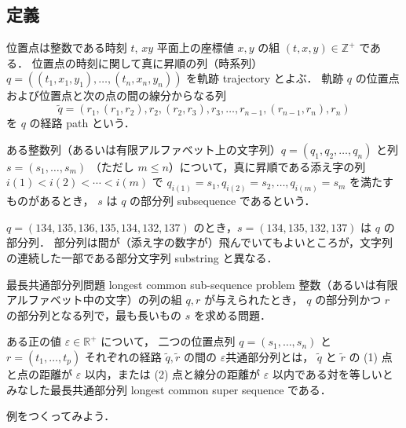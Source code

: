\documentclass[11pt]{jreport}
\begin{document}
\subsection*{定義}
位置点は整数である時刻 $t$, $xy$ 平面上の座標値 $x, y$ の組 $(t, x, y) \in \mathbb{Z}^+$ である． 
位置点の時刻に関して真に昇順の列（時系列） $q = ((t_1, x_1, y_1), \ldots,(t_n,x_n,y_n))$ を軌跡 trajectory とよぶ．
軌跡 $q$ の位置点および位置点と次の点の間の線分からなる列
\[
\tilde{q} = (r_1, (r_1, r_2), r_2, (r_2, r_3), r_3, \ldots, r_{n-1}, (r_{n-1}, r_n), r_n)
\]
を $q$ の経路 path という．

ある整数列（あるいは有限アルファベット上の文字列）$q = (q_1, q_2, \ldots, q_n)$ と列 $s = (s_1, \ldots, s_m)$ （ただし $m \leq n$）について，真に昇順である添え字の列 $i(1) < i(2) < \cdots < i(m)$ で $q_{i(1)} = s_1, q_{i(2)} = s_2, \ldots, q_{i(m)} = s_m$ を満たすものがあるとき，
$s$ は $q$ の部分列 subsequence であるという．
\begin{example}
$q = (134, 135, 136, 135, 134, 132, 137)$ のとき，$s = (134, 135, 132, 137)$ は $q$ の部分列．
部分列は間が（添え字の数字が）飛んでいてもよいところが，文字列の連続した一部である部分文字列 substring と異なる．
\end{example}

\begin{defn}{最長共通部分列問題 longest common sub-sequence problem}
整数（あるいは有限アルファベット中の文字）の列の組 $q, r$ が与えられたとき，
$q$ の部分列かつ $r$ の部分列となる列で，最も長いもの $s$ を求める問題．
\end{defn}

\begin{defn}[2つの位置点列の最長共通部分列]
ある正の値 $\varepsilon \in \mathbb{R}^+$ について，
二つの位置点列 $q = (s_1, \ldots, s_n)$ と $r = (t_1, \ldots, t_p)$ それぞれの経路 $\tilde{q}, \tilde{r}$ の間の $\varepsilon$共通部分列とは，
 $\tilde{q}$ と $\tilde{r}$ の (1) 点と点の距離が $\varepsilon$ 以内，または (2) 点と線分の距離が $\varepsilon$ 以内である対を等しいとみなした最長共通部分列 longest common super sequence である．
\end{defn}

\begin{example}
例をつくってみよう．
\end{example}
\end{document}
